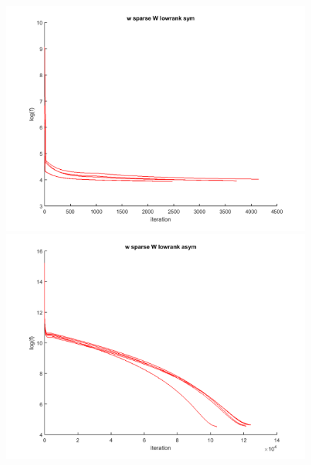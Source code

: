 \documentclass{article}
\begin{document}
\begin{figure}[htbp]
  \centering
  \begin{minipage}{0.24\textwidth}
    \centering
    \includegraphics[width=1\textwidth]{images/xin_sym}
  \end{minipage}
  \hfill
  \begin{minipage}{0.24\textwidth}
    \centering
    \includegraphics[width=1\textwidth]{images/xin_asym}
  \end{minipage}
  \hfill
  \begin{minipage}{0.24\textwidth}
    \centering

\end{minipage}
\end{figure}
\end{document}
